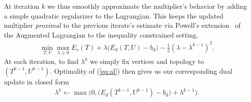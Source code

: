 At iteration $k$ we thus smoothly approximate the multiplier's behavior by adding a simple quadratic regularizer to the Lagrangian. This keeps the updated multiplier \emph{proximal} to the previous iterate's estimate via Powell's extension\ \cite{Powell73} of the Augmented Lagrangian to the inequality constrained setting,
\begin{align}
\label{eq:al}
	\min_{T,V} \max_{\lambda \geq 0} E_{s}(T) + \lambda \big( E_{d}(T, U) - b_d\big) - \tfrac{1}{2} (\lambda- \lambda^{k-1})^2. 
\end{align} 
At each iteration, to find $\lambda^k$ we simply fix vertices and topology to  $(T^{k-1},U^{k-1})$. Optimality of (\ref{eq:al}) then gives us our corresponding dual update in closed form
\begin{align}
\lambda^{k} \leftarrow \max\big(0,\big( E_{d}(T^{k-1}, U^{k-1}) -b_d \big) + \lambda^{k-1}\big).	
\end{align}






%
%



